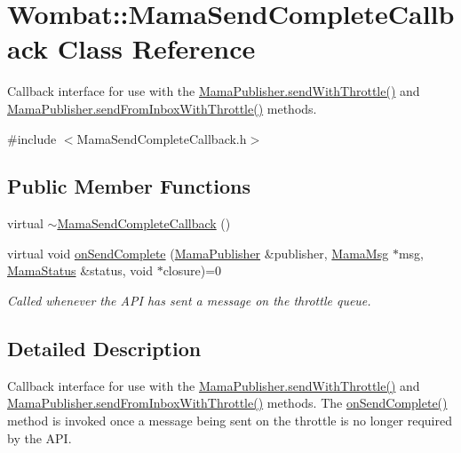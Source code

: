 \hypertarget{classWombat_1_1MamaSendCompleteCallback}{
\section{Wombat::MamaSendCompleteCallback Class Reference}
\label{classWombat_1_1MamaSendCompleteCallback}
}


Callback interface for use with the \hyperlink{classWombat_1_1MamaPublisher_a77970e88c69a850c451d36fcb5c720cd}{MamaPublisher.sendWithThrottle()} and \hyperlink{classWombat_1_1MamaPublisher_aa9804ff85813df84e94bdea6215ae352}{MamaPublisher.sendFromInboxWithThrottle()} methods.  


{\ttfamily \#include $<$MamaSendCompleteCallback.h$>$}\subsection*{Public Member Functions}
\begin{DoxyCompactItemize}
\item 
virtual \hyperlink{classWombat_1_1MamaSendCompleteCallback_ad4a151b81e17fecebeeda573bba405c3}{$\sim$MamaSendCompleteCallback} ()
\item 
virtual void \hyperlink{classWombat_1_1MamaSendCompleteCallback_aa6f6cd10cb4b7b5c84c74056badd365f}{onSendComplete} (\hyperlink{classWombat_1_1MamaPublisher}{MamaPublisher} \&publisher, \hyperlink{classWombat_1_1MamaMsg}{MamaMsg} $\ast$msg, \hyperlink{classWombat_1_1MamaStatus}{MamaStatus} \&status, void $\ast$closure)=0
\begin{DoxyCompactList}\small\item\em Called whenever the API has sent a message on the throttle queue. \item\end{DoxyCompactList}\end{DoxyCompactItemize}


\subsection{Detailed Description}
Callback interface for use with the \hyperlink{classWombat_1_1MamaPublisher_a77970e88c69a850c451d36fcb5c720cd}{MamaPublisher.sendWithThrottle()} and \hyperlink{classWombat_1_1MamaPublisher_aa9804ff85813df84e94bdea6215ae352}{MamaPublisher.sendFromInboxWithThrottle()} methods. The {\ttfamily \hyperlink{classWombat_1_1MamaSendCompleteCallback_aa6f6cd10cb4b7b5c84c74056badd365f}{onSendComplete()}} method is invoked once a message being sent on the throttle is no longer required by the API.

